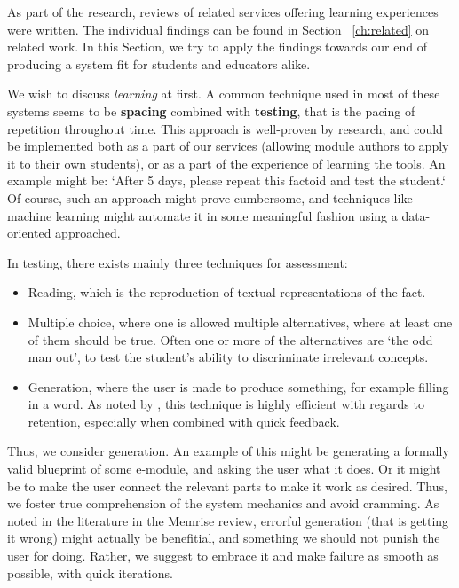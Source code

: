 As part of the research, reviews of related services offering learning
experiences were written. The individual findings can be found in Section
~\ref{ch:related} on related work. In this Section, we try to apply the
findings towards our end of producing a system fit for students and educators 
alike.

We wish to discuss \textit{learning} at first. A common technique used in most
of these systems seems to be \textbf{spacing} combined with \textbf{testing},
that is the pacing of repetition throughout time. This approach is well-proven
by research, and could be implemented both as a part of our services (allowing
module authors to apply it to their own students), or as a part of the
experience of learning the tools. An example might be: `After 5 days, please
repeat this factoid and test the student.` Of course, such an approach might
prove cumbersome, and techniques like machine learning might automate it in some
meaningful fashion using a data-oriented approached.

In testing, there exists mainly three techniques for assessment:

\begin{itemize}
\item Reading, which is the reproduction of textual representations of the fact.
\item Multiple choice, where one is allowed multiple alternatives, where at
least one of them should be true. Often one or more of the alternatives are `the
odd man out', to test the student's ability to discriminate irrelevant concepts.
\item Generation, where the user is made to produce something, for example
filling in a word. As noted by \cite{potts2014benefit}, this technique is 
highly efficient with regards to retention, especially when combined with 
quick feedback.
\end{itemize}

Thus, we consider generation. An example of this might be generating a formally
valid blueprint of some e-module, and asking the user what it does. Or it might
be to make the user connect the relevant parts to make it work as desired. Thus,
we foster true comprehension of the system mechanics and avoid cramming. As
noted in the literature in the Memrise review, errorful generation (that is
getting it wrong) might actually be benefitial, and something we should not
punish the user for doing. Rather, we suggest to embrace it and make failure as
smooth as possible, with quick iterations.

